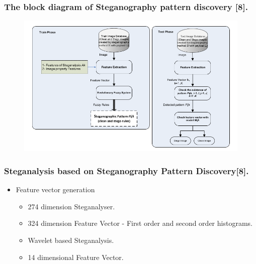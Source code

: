 \documentclass{beamer} %
\theoremstyle{definition} %
\begin{document}
\begin{frame}
\frametitle{The block diagram of Steganography pattern discovery [8].}
\begin{figure}
\includegraphics[scale=0.37]{spdBlockDiag.png}
\end{figure}
\end{frame}

\begin{frame}
\frametitle{Steganalysis based on Steganography Pattern Discovery[8].}
\begin{itemize}
	\item Feature vector generation
	\begin{itemize}
	\item 274 dimension Steganalyser.
	\item 324 dimension Feature Vector - First order and second order histograms.
	\item Wavelet based Steganalysis.
	\item 14 dimensional Feature Vector.
	\end{itemize}
\end{itemize}
\end{frame}
\end{document}
